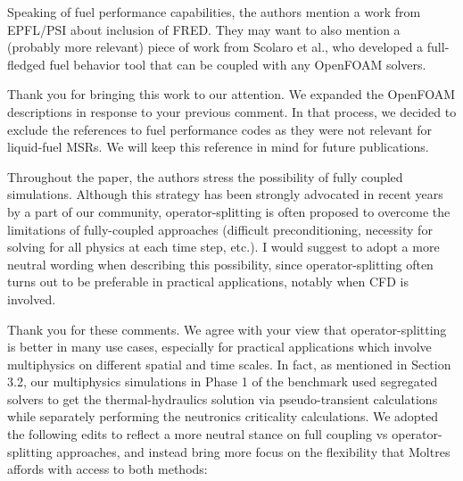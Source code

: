 \documentclass[answers,11pt]{exam}
\begin{document}
\begin{questions}
        \question Speaking of fuel performance capabilities, the authors
        mention a work from EPFL/PSI about inclusion of FRED. They may want to
        also mention a (probably more relevant) piece of work from Scolaro et
        al., who
        developed a full-fledged fuel behavior tool that can be coupled with
        any OpenFOAM solvers.
        \begin{solution}
        	Thank you for bringing this work to our attention. We expanded the
        	OpenFOAM descriptions in response to your previous comment. In
        	that process, we decided to exclude the references to fuel
        	performance codes as they were not relevant for liquid-fuel MSRs.
        	We will keep this reference in mind for future publications.
        \end{solution}

        \question Throughout the paper, the authors stress the possibility of fully coupled simulations. Although this strategy has been strongly advocated in recent years by a part of our community, operator-splitting is often proposed to overcome the limitations of fully-coupled approaches (difficult preconditioning, necessity for solving for all physics at each time step, etc.).  I would suggest to adopt a more neutral wording when describing this possibility, since operator-splitting often turns out to be preferable in practical applications, notably when CFD is involved.

        \begin{solution}
        	Thank you for these comments. We agree with your view that
        	operator-splitting is better in many use cases, especially for
        	practical applications which involve multiphysics on different
        	spatial and time scales. In fact, as mentioned in Section 3.2,
        	our multiphysics simulations in
        	Phase 1 of the benchmark used segregated solvers to get the
        	thermal-hydraulics solution via pseudo-transient calculations while
        	separately performing the neutronics criticality calculations. We
        	adopted the following edits to reflect a more neutral stance on
        	full coupling
        	vs operator-splitting approaches, and instead bring more focus on
        	the flexibility that Moltres affords with access to both methods:
        	

\end{solution}
\end{questions}
\end{document}

